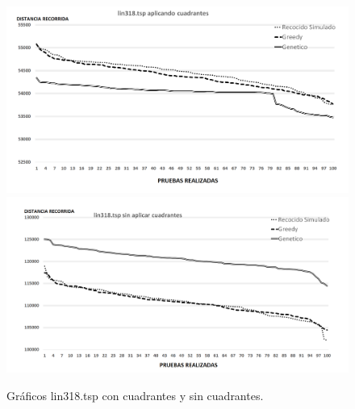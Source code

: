  \begin{figure}[hbtp]
    \centering
        \includegraphics[width=1\textwidth]{PruebasResultados/Experimentos_Graficos_Con/lin318.png}
        \includegraphics[width=1\textwidth]{PruebasResultados/Experimentos_Graficos_Sin/lin318.png}
        \caption{Gráficos lin318.tsp con cuadrantes y sin cuadrantes.}
        \label{fig:lin318_grafica.png}
\end{figure}
\newpage

